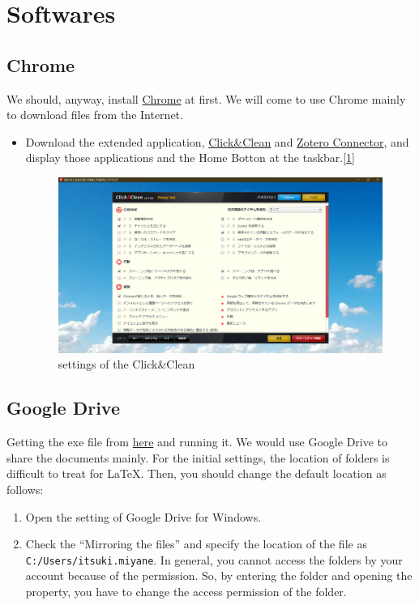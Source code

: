 \documentclass[a4paper,pdftex]{article}
\begin{document}
\section{Softwares}

\subsection{Chrome}

We should, anyway, install \uline{Chrome} at first. We will come to use Chrome mainly to download files from the Internet.

\begin{itemize}
  \item 
  Download the extended application, \uline{Click\&Clean} and \uline{Zotero Connector}, and display those applications and the Home Botton at the taskbar.[\ref{cc}]

  \begin{figure}[ht]
    \centering
    \includegraphics[width=0.8\columnwidth]{fig/ClickClean.png}
    \caption{settings of the Click\&Clean}
    \label{cc}
  \end{figure}

\end{itemize}

\subsection{Google Drive}

Getting the exe file from \href{https://www.google.com/intl/ja_jp/drive/download/}{here} and running it. We would use Google Drive to share the documents mainly. For the initial settings, the location of folders is difficult to treat for \LaTeX. Then, you should change the default location as follows:

\begin{enumerate}
  \item 
  Open the setting of Google Drive for Windows.

  \item 
  Check the ``Mirroring the files'' and specify the location of the file as \\ \texttt{C:/Users/itsuki.miyane}. In general, you cannot access the folders by your account because of the permission. So, by entering the folder and opening the property, you have to change the access permission of the folder.
  
\end{enumerate}
\end{document}
